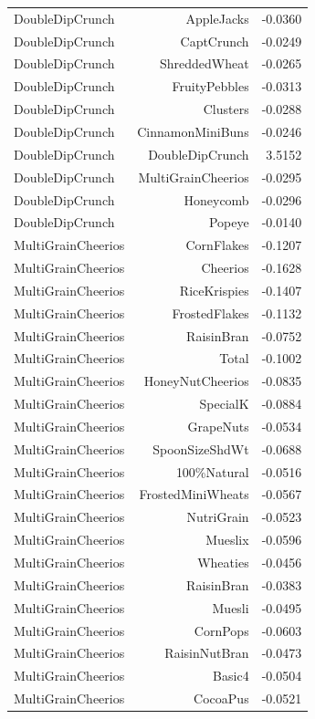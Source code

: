 \begin{longtable}{@{}lrr@{}}
DoubleDipCrunch & AppleJacks & -0.0360 \\
DoubleDipCrunch & CaptCrunch & -0.0249 \\
DoubleDipCrunch & ShreddedWheat & -0.0265 \\
DoubleDipCrunch & FruityPebbles & -0.0313 \\
DoubleDipCrunch & Clusters & -0.0288 \\
DoubleDipCrunch & CinnamonMiniBuns & -0.0246 \\
DoubleDipCrunch & DoubleDipCrunch & 3.5152 \\
DoubleDipCrunch & MultiGrainCheerios & -0.0295 \\
DoubleDipCrunch & Honeycomb & -0.0296 \\
DoubleDipCrunch & Popeye & -0.0140 \\
MultiGrainCheerios & CornFlakes & -0.1207 \\
MultiGrainCheerios & Cheerios & -0.1628 \\
MultiGrainCheerios & RiceKrispies & -0.1407 \\
MultiGrainCheerios & FrostedFlakes & -0.1132 \\
MultiGrainCheerios & RaisinBran & -0.0752 \\
MultiGrainCheerios & Total & -0.1002 \\
MultiGrainCheerios & HoneyNutCheerios & -0.0835 \\
MultiGrainCheerios & SpecialK & -0.0884 \\
MultiGrainCheerios & GrapeNuts & -0.0534 \\
MultiGrainCheerios & SpoonSizeShdWt & -0.0688 \\
MultiGrainCheerios & 100\%Natural & -0.0516 \\
MultiGrainCheerios & FrostedMiniWheats & -0.0567 \\
MultiGrainCheerios & NutriGrain & -0.0523 \\
MultiGrainCheerios & Mueslix & -0.0596 \\
MultiGrainCheerios & Wheaties & -0.0456 \\
MultiGrainCheerios & RaisinBran & -0.0383 \\
MultiGrainCheerios & Muesli & -0.0495 \\
MultiGrainCheerios & CornPops & -0.0603 \\
MultiGrainCheerios & RaisinNutBran & -0.0473 \\
MultiGrainCheerios & Basic4 & -0.0504 \\
MultiGrainCheerios & CocoaPus & -0.0521 \\

\end{longtable}
